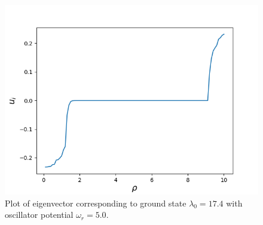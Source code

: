 \documentclass[aip,nobalancelastpage,
twocolumn,
rsi,%
 amsmath,amssymb,
 reprint,%
]{revtex4}
\begin{document}
\begin{figure}[H]
\center
\includegraphics[scale=0.5]{wr5.png}
\caption{Plot of eigenvector corresponding to ground state $\lambda_0=17.4$ with oscillator potential $\omega_r = 5.0$.}
\label{part 3: plot 4}
\end{figure}
\end{document}
